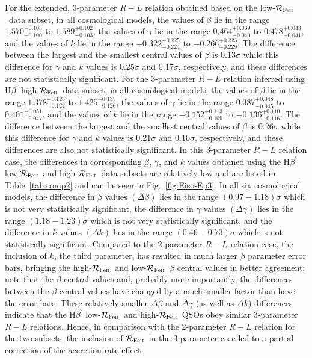 \documentclass[a4paper,fleqn,usenatbib]{mnras}
\newcommand{\rfe}{${\cal R}_{\rm{Fe\textsc{ii}}}$}
\begin{document}
For the extended, 3-parameter $R-L$ relation obtained based on the low-\rfe\ data subset, in all cosmological models, the values of $\beta$ lie in the range $1.570^{+0.103}_{-0.100}$ to $1.589^{+0.102}_{-0.103}$, the values of $\gamma$ lie in the range $0.464^{+0.039}_{-0.040}$ to $0.478^{+0.043}_{-0.041}$, and the values of $k$ lie in the range $-0.322^{+0.225}_{-0.224}$ to $-0.266^{+0.223}_{-0.229}$. The difference between the largest and the smallest central values of $\beta$ is 0.13$\sigma$ while this difference for $\gamma$ and $k$ values is 0.25$\sigma$ and 0.17$\sigma$, respectively, and these differences are not statistically significant. For the 3-parameter $R-L$ relation inferred using H$\beta^{\prime}$ high-\rfe\ data subset, in all cosmological models, the values of $\beta$ lie in the range $1.378^{+0.128}_{-0.122}$ to $1.425^{+0.135}_{-0.126}$, the values of $\gamma$ lie in the range $0.387^{+0.048}_{-0.045}$ to $0.401^{+0.051}_{-0.047}$, and the values of $k$ lie in the range $-0.152^{+0.113}_{-0.109}$ to $-0.136^{+0.110}_{-0.116}$. The difference between the largest and the smallest central values of $\beta$ is 0.26$\sigma$ while this difference for $\gamma$ and $k$ values is 0.21$\sigma$ and 0.10$\sigma$, respectively, and these differences are also not statistically significant. In this 3-parameter $R-L$ relation case, the differences in corresponding $\beta$, $\gamma$, and $k$ values obtained using the H$\beta^{\prime}$ low-\rfe\ and high-\rfe\ data subsets are relatively low and are listed in Table~\ref{tab:comp2} and can be seen in Fig.\ \ref{fig:Eiso-Ep3}. In all six cosmological models, the difference in $\beta$ values $(\Delta \beta)$ lies in the range $(0.97-1.18)\sigma$ which is not very statistically significant, the difference in $\gamma$ values $(\Delta \gamma)$ lies in the range $(1.18-1.23)\sigma$ which is not very statistically significant, and the difference in $k$ values $(\Delta k)$ lies in the range $(0.46-0.73)\sigma$ which is not statistically significant. Compared to the 2-parameter $R-L$ relation case, the inclusion of $k$, the third parameter, has resulted in much larger $\beta$ parameter error bars, bringing the high-\rfe\ and low-\rfe\ $\beta$ central values in better agreement; note that the $\beta$ central values and, probably more importantly, the differences between the $\beta$ central values have changed by a much smaller factor than have the error bars. These relatively smaller $\Delta \beta$ and $\Delta \gamma$ (as well as $\Delta k$) differences indicate that the H$\beta^{\prime}$ low-\rfe\ and high-\rfe\ QSOs obey similar 3-parameter $R-L$ relations. Hence, in comparison with the 2-parameter $R-L$ relation for the two subsets, the inclusion of \rfe\ in the 3-parameter case led to a partial correction of the accretion-rate effect.
\end{document}
